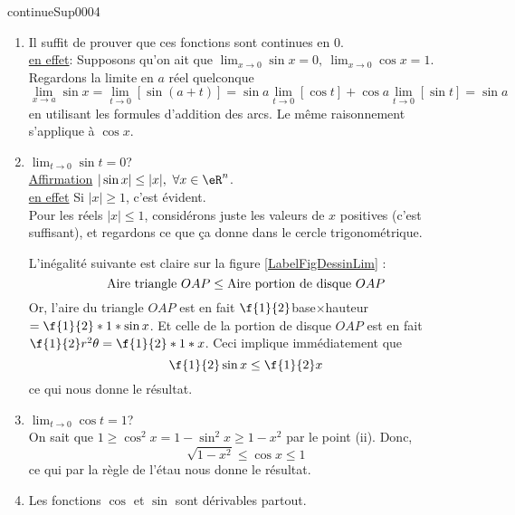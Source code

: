 
\begin{corrige}{continueSup0004}

\begin{enumerate}
\item  Il suffit de prouver que ces fonctions sont continues en $0$.\\
\underline{en effet}: Supposons qu'on ait que $\lim_{x\rightarrow  0} \sin x = 0, \ \lim_{x\rightarrow  0} \cos x = 1$. Regardons la limite  en $a$ réel quelconque
\[
	\lim_{x\rightarrow  a} \sin x= \lim_{t\rightarrow  0}[ \sin (a+t)] = \sin a \lim_{t\rightarrow  0}[ \cos t] + \cos a \lim_{t\rightarrow  0} [\sin  t] = \sin a
\]
en utilisant les formules d'addition des arcs. Le même raisonnement s'applique à $\cos x$. 


\item $\lim_{t\rightarrow  0} \sin t  =0$?\\
\underline{Affirmation} $|\sin x| \leq |x|, \ \forall x \in \eR^n$.\\
\underline{en effet} Si $|x|\geq 1$, c'est évident.\\
Pour les réels $|x|\leq 1$, considérons juste les valeurs de $x$ positives (c'est suffisant), et regardons ce que ça donne dans le cercle trigonométrique.

\newcommand{\CaptionFigDessinLim}{Dessin qui permet de calculer quelque limites.}


L'inégalité suivante est claire sur la figure \ref{LabelFigDessinLim} :
\[ {\rm Aire \ triangle \ }  OAP \leq {\rm Aire \  portion \  de \  disque \ } OAP\]
Or, l'aire du triangle $OAP$ est en fait $\f{1}{2}$base$\times$hauteur $= \f{1}{2}*1*\sin x$. Et celle de la portion de disque $OAP$ est en fait $\f{1}{2}r^2\theta = \f{1}{2}*1* x$. Ceci implique immédiatement que 
\[\f{1}{2}\sin x \leq \f{1}{2} x\] ce qui nous donne le résultat.

\item $\lim_{t\rightarrow  0} \cos t  =1$?\\

On sait que $1\geq \cos^2 x = 1-\sin^2 x \geq 1-x^2$ par le point (ii). Donc, 
\[
\sqrt{1-x^2}\leq \cos x \leq 1
\] ce qui par la règle de l'étau nous donne le résultat.

\item Les fonctions $\cos $ et $\sin$ sont dérivables partout. \\



\end{enumerate}
\end{corrige}
